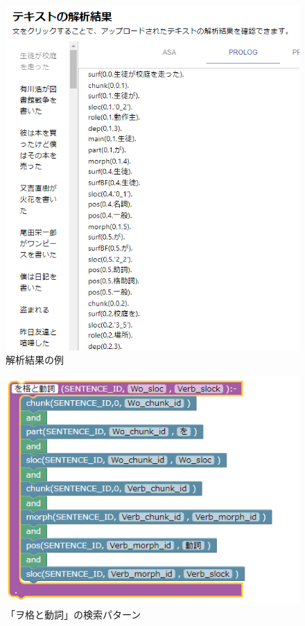 \documentclass{FITpaper}
\begin{document}
\begin{figure}[htbp]
  \centering
  \includegraphics[scale=0.4]{fig/convert_result_prolog.png}
  \caption{解析結果の例}
  \label{fig:show_prolog}
\end{figure}



\begin{figure}[htbp]
  \centering
  \includegraphics[scale=0.6]{fig/wo.png}
  \caption{「ヲ格と動詞」の検索パターン}
  \label{fig:wo_block}
\end{figure}
\end{document}
